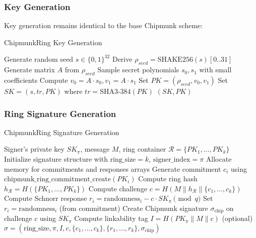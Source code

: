 \documentclass[11pt,a4paper]{article}
\begin{document}
\subsubsection{Key Generation}
Key generation remains identical to the base Chipmunk scheme:
\begin{algorithm}
\caption{ChipmunkRing Key Generation}
\begin{algorithmic}[1]
\STATE Generate random seed $s \in \{0,1\}^{32}$
\STATE Derive $\rho_{seed} = \text{SHAKE256}(s)[0..31]$
\STATE Generate matrix $A$ from $\rho_{seed}$
\STATE Sample secret polynomials $s_0, s_1$ with small coefficients
\STATE Compute $v_0 = A \cdot s_0, v_1 = A \cdot s_1$
\STATE Set $PK = (\rho_{seed}, v_0, v_1)$
\STATE Set $SK = (s, tr, PK)$ where $tr = \text{SHA3-384}(PK)$
\RETURN $(SK, PK)$
\end{algorithmic}
\end{algorithm}

\subsubsection{Ring Signature Generation}
\begin{algorithm}
\caption{ChipmunkRing Signature Generation}
\begin{algorithmic}[1]
\REQUIRE Signer's private key $SK_\pi$, message $M$, ring container $\mathcal{R} = \{PK_1, \ldots, PK_k\}$
\STATE Initialize signature structure with $\text{ring\_size} = k$, $\text{signer\_index} = \pi$
\STATE Allocate memory for commitments and responses arrays
    \STATE Generate commitment $c_i$ using $\text{chipmunk\_ring\_commitment\_create}(PK_i)$
\ENDFOR
\STATE Compute ring hash $h_{\mathcal{R}} = H(\{PK_1, \ldots, PK_k\})$
\STATE Compute challenge $c = H(M \| h_{\mathcal{R}} \| \{c_1, \ldots, c_k\})$
        \STATE Compute Schnorr response $r_i = \text{randomness}_i - c \cdot SK_\pi \pmod{q}$
    \ELSE
        \STATE Set $r_i = \text{randomness}_i$ (from commitment)
    \ENDIF
\ENDFOR
\STATE Create Chipmunk signature $\sigma_{\text{chip}}$ on challenge $c$ using $SK_\pi$
\STATE Compute linkability tag $I = H(PK_\pi \| M \| c)$ (optional)
\RETURN $\sigma = (\text{ring\_size}, \pi, I, c, \{c_1, \ldots, c_k\}, \{r_1, \ldots, r_k\}, \sigma_{\text{chip}})$
\end{algorithmic}
\end{algorithm}
\end{document}
